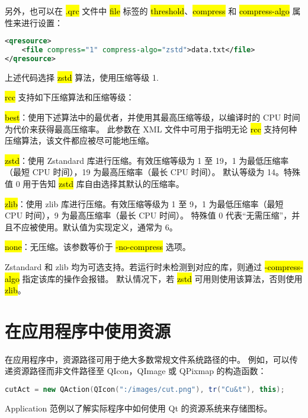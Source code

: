另外，也可以在 \hl{.qrc} 文件中 \hl{file} 标签的 \hl{threshold}、\hl{compress} 和 \hl{compress-algo} 属性来进行设置：

\begin{lstlisting}[language=XML]  
<qresource>
    <file compress="1" compress-algo="zstd">data.txt</file>
</qresource>
\end{lstlisting}

上述代码选择 \hl{zstd} 算法，使用压缩等级 1.

\hl{rcc} 支持如下压缩算法和压缩等级：

\begin{compactitem}
\item \hl{best}：使用下述算法中的最优者，并使用其最高压缩等级，以编译时的 CPU 时间为代价来获得最高压缩率。
    此参数在 XML 文件中可用于指明无论 \hl{rcc} 支持何种压缩算法，该文件都应被尽可能地压缩。
\item \hl{zstd}：使用 Zstandard 库进行压缩。有效压缩等级为 1 至 19，1 为最低压缩率（最短 CPU 时间），19 为最高压缩率（最长 CPU 时间）。
 默认等级为 14。特殊值 0 用于告知 \hl{zstd} 库自由选择其默认的压缩率。
\item \hl{zlib}：使用 zlib 库进行压缩。有效压缩等级为 1 至 9，1 为最低压缩率（最短 CPU 时间），9 为最高压缩率（最长 CPU 时间）。
    特殊值 0 代表“无需压缩”，并且不应被使用。默认值为实现定义，通常为 6。
\item \hl{none}：无压缩。该参数等价于 \hl{-no-compress} 选项。
\end{compactitem}

Zstandard 和 zlib 均为可选支持。若运行时未检测到对应的库，则通过 \hl{-compress-algo} 指定该库的操作会报错。
默认情况下，若 \hl{zstd} 可用则使用该算法，否则使用 \hl{zlib}。

\section{在应用程序中使用资源}

在应用程序中，资源路径可用于绝大多数常规文件系统路径的中。
例如，可以传递资源路径而非文件路径至 QIcon，QImage 或 QPixmap 的构造函数：

\begin{lstlisting}[language=C++]
cutAct = new QAction(QIcon(":/images/cut.png"), tr("Cu&t"), this);
\end{lstlisting}

\begin{notice}
Application 范例以了解实际程序中如何使用 Qt 的资源系统来存储图标。
\end{notice}

